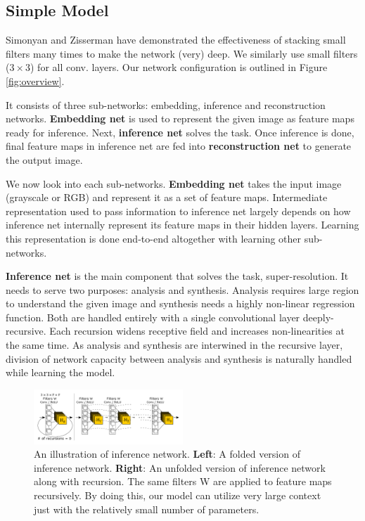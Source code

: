\documentclass[10pt,twocolumn,letterpaper]{article}
\begin{document}
\subsection{Simple Model}

Simonyan and Zisserman \cite{simonyan2015very} have demonstrated the effectiveness of stacking small filters many times to make the network (very) deep. We similarly use small filters ($3\times3$) for all conv. layers. 
Our network configuration is outlined in Figure \ref{fig:overview}.

It consists of three sub-networks: embedding, inference and reconstruction networks.  \textbf{Embedding net} is used to represent the given image as feature maps ready for inference. Next, \textbf{inference net} solves the task. Once inference is done, final feature maps in inference net are fed into \textbf{reconstruction net} to generate the output image.

We now look into each sub-networks. \textbf{Embedding net} takes the input image (grayscale or RGB) and represent it as a set of feature maps. Intermediate representation used to pass information to inference net largely depends on how inference net internally represent its feature maps in their hidden layers. Learning this representation is done end-to-end altogether with learning other sub-networks.


\textbf{Inference net} is the main component that solves the task, super-resolution. It needs to serve two purposes: analysis and synthesis. Analysis requires large region to understand the given image and synthesis needs a highly non-linear regression function. Both are handled entirely with a single convolutional layer deeply-recursive. Each recursion widens receptive field and increases non-linearities at the same time. As analysis and synthesis are interwined in the recursive layer, division of network capacity between analysis and synthesis is naturally handled while learning the model. 

\begin{figure}
	\includegraphics[width=0.5\textwidth]{figs/f2}
	\caption {An illustration of inference network. \textbf{Left}: A folded version of inference network. \textbf{Right}: An unfolded version of inference network along with recursion. The same filters W are applied to feature maps recursively. By doing this, our model can utilize very large context just with the relatively small number of parameters.}
\end{figure}
\end{document}

